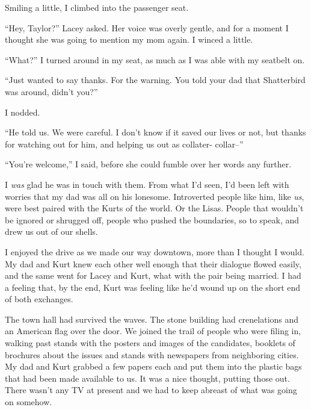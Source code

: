 Smiling a little, I climbed into the passenger seat.



``Hey, Taylor?'' Lacey asked.  Her voice was overly gentle, and for a moment I thought she was going to mention my mom again.  I winced a little.



``What?''  I turned around in my seat, as much as I was able with my seatbelt on.



``Just wanted to say thanks.  For the warning.  You told your dad that Shatterbird was around, didn't you?''



I nodded.



``He told us.  We were careful.  I don't know if it saved our lives or not, but thanks for watching out for him, and helping us out as collater- collar--''



``You're welcome,'' I said, before she could fumble over her words any further.



I \emph{was} glad he was in touch with them.  From what I'd seen, I'd been left with worries that my dad was all on his lonesome.  Introverted people like him, like \emph{us}, were best paired with  the Kurts of the world.  Or the Lisas.  People that wouldn't be ignored or shrugged off, people who pushed the boundaries, so to speak, and drew us out of our shells.



I enjoyed the drive as we made our way downtown, more than I thought I would.  My dad and Kurt knew each other well enough that their dialogue flowed easily, and the same went for Lacey and Kurt, what with the pair being married.  I had a feeling that, by the end, Kurt was feeling like he'd wound up on the short end of both exchanges.



The town hall had survived the waves.  The stone building had crenelations and an American flag over the door.  We joined the trail of people who were filing in, walking past stands with the posters and images of the candidates, booklets of brochures about the issues and stands with newspapers from neighboring cities.  My dad and Kurt grabbed a few papers each and put them into the plastic bags that had been made available to us.  It was a nice thought, putting those out.  There wasn't any TV at present and we had to keep abreast of what was going on somehow.




